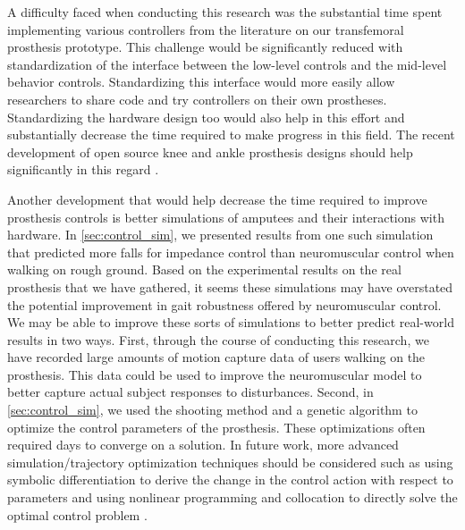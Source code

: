 A difficulty faced when conducting this research was the substantial time spent
implementing various controllers from the literature on our transfemoral
prosthesis prototype.  This challenge would be significantly reduced with
standardization of the interface between the low-level controls and the
mid-level behavior controls. Standardizing this interface would more easily
allow researchers to share code and try controllers on their own prostheses.
Standardizing the hardware design too would also help in this effort and
substantially decrease the time required to make progress in this field. The
recent development of open source knee and ankle prosthesis designs should help
significantly in this regard \citep{azocar2018design}.

Another development that would help decrease the time required to improve
prosthesis controls is better simulations of amputees and their interactions
with hardware. In \cref{sec:control_sim}, we presented results from one such
simulation that predicted more falls for impedance control than neuromuscular
control when walking on rough ground. Based on the experimental results on the
real prosthesis that we have gathered, it seems these simulations may have
overstated the potential improvement in gait robustness offered by neuromuscular
control. We may be able to improve these sorts of simulations to better predict
real-world results in two ways. First, through the course of conducting this
research, we have recorded large amounts of motion capture data of users walking
on the prosthesis. This data could be used to improve the neuromuscular model to
better capture actual subject responses to disturbances. Second, in
\cref{sec:control_sim}, we used the shooting method and a genetic algorithm
\citep{hansen2006cma} to optimize the control parameters of the prosthesis.
These optimizations often required days to converge on a solution. In future
work, more advanced simulation/trajectory optimization techniques should be
considered such as using symbolic differentiation to derive the change in the
control action with respect to parameters and using nonlinear programming and
collocation to directly solve the optimal control problem
\citep{hargraves1987direct}. 

